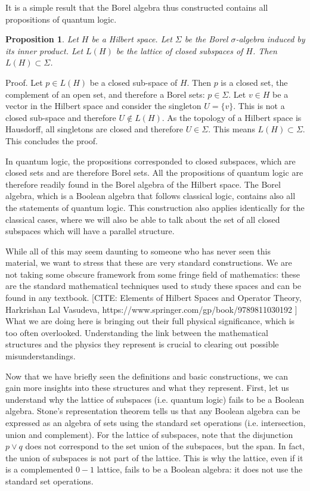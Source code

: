 \documentclass[11pt, executivepaper]{article}
\newtheorem{prop}{Proposition}
\begin{document}
It is a simple result that the Borel algebra thus constructed contains all propositions of quantum logic.

\begin{prop}
	Let $H$ be a Hilbert space. Let $\Sigma$ be the Borel $\sigma$-algebra induced by its inner product. Let $L(H)$ be the lattice of closed subspaces of $H$. Then $L(H) \subset \Sigma$.
\end{prop}

Proof. Let $p \in L(H)$ be a closed sub-space of $H$. Then $p$ is a closed set, the complement of an open set, and therefore a Borel sets: $p \in \Sigma$. Let $v \in H$ be a vector in the Hilbert space and consider the singleton $U = \{ v \}$. This is not a closed sub-space and therefore $U \notin L(H)$. As the topology of a Hilbert space is Hausdorff, all singletons are closed and therefore $U \in \Sigma$. This means $L(H) \subset \Sigma$. This concludes the proof.

In quantum logic, the propositions corresponded to closed subspaces, which are closed sets and are therefore Borel sets. All the propositions of quantum logic are therefore readily found in the Borel algebra of the Hilbert space. The Borel algebra, which is a Boolean algebra that follows classical logic, contains also all the statements of quantum logic. This construction also applies identically for the classical cases, where we will also be able to talk about the set of all closed subspaces which will have a parallel structure.

While all of this may seem daunting to someone who has never seen this material, we want to stress that these are very standard constructions. We are not taking some obscure framework from some fringe field of mathematics: these are the standard mathematical techniques used to study these spaces and can be found in any textbook. [CITE: Elements of Hilbert Spaces and Operator Theory, Harkrishan Lal Vasudeva, https://www.springer.com/gp/book/9789811030192 ] What we are doing here is bringing out their full physical significance, which is too often overlooked. Understanding the link between the mathematical structures and the physics they represent is crucial to clearing out possible misunderstandings.

Now that we have briefly seen the definitions and basic constructions, we can gain more insights into these structures and what they represent. First, let us understand why the lattice of subspaces (i.e. quantum logic) fails to be a Boolean algebra. Stone's representation theorem tells us that any Boolean algebra can be expressed as an algebra of sets using the standard set operations (i.e. intersection, union and complement). For the lattice of subspaces, note that the disjunction $p \vee q$ does not correspond to the set union of the subspaces, but the span. In fact, the union of subspaces is not part of the lattice.  This is why the lattice, even if it is a complemented $0-1$ lattice, fails to be a Boolean algebra: it does not use the standard set operations.
\end{document}
